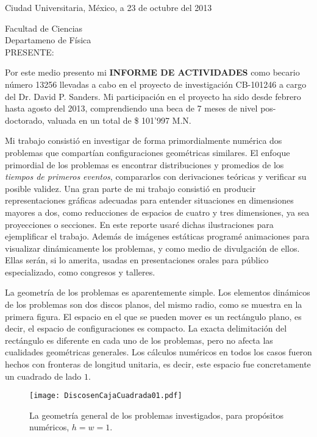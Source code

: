 \documentclass[letterpaper, 11pt]{article}
\author{Wilhelm Pablo Karel Zapfe Zaldivar}
\begin{document}
\begin{flushright}
Ciudad Universitaria, México, a 23 de octubre del 2013
\end{flushright}
 
\vspace{4cm}
\noindent Facultad de Ciencias
\\ Departameno de Física \\ 
PRESENTE:

\vspace{2cm}

Por este medio presento mi \textbf{INFORME DE ACTIVIDADES} como becario 
número 13256 llevadas a cabo en el proyecto de investigación
CB-101246 a cargo del Dr. David P. Sanders. Mi participación en el proyecto
ha sido desde febrero hasta agosto del 2013, 
comprendiendo una beca
de 7 meses de nivel pos-doctorado, valuada en un total de \$ 101'997 M.N.

Mi trabajo consistió en investigar de forma primordialmente
numérica dos problemas
que compartían configuraciones geométricas similares.
El enfoque primordial de los problemas es encontrar distribuciones y
promedios de los \emph{tiempos de primeros eventos},  
compararlos con derivaciones
teóricas y verificar su posible validez. Una gran parte de mi trabajo
consistió en producir representaciones gráficas adecuadas para
entender situaciones en dimensiones mayores a dos, como
reducciones de espacios de cuatro y tres dimensiones, ya
sea proyecciones o secciones. En este reporte 
usaré dichas ilustraciones para ejemplificar el
trabajo. Además de imágenes estáticas programé 
animaciones para visualizar dinámicamente los problemas, y como
medio de divulgación de ellos. Ellas serán, si lo amerita, usadas
en presentaciones orales 
para público especializado, como congresos y talleres.

La geometría de los problemas es aparentemente simple.
Los elementos dinámicos de los problemas son dos discos
planos, del mismo radio, como se muestra en la primera figura. 
El espacio en el que se pueden mover es un rectángulo plano, es 
decir, el espacio de configuraciones es compacto. La exacta
delimitación del rectángulo es diferente en cada uno de los
problemas, pero no afecta las cualidades geométricas generales.
Los cálculos numéricos en todos los casos fueron hechos con
fronteras de longitud unitaria, es decir, este espacio fue 
concretamente un cuadrado de lado $1$. 

\begin{figure}[h]
  \centering
 \texttt{[image: DiscosenCajaCuadrada01.pdf]}
 \caption{La geometría general de los problemas investigados, para propósitos
numéricos, $h=w=1$.}
 \label{PrimeraFigura}
\end{figure}
\end{document}
